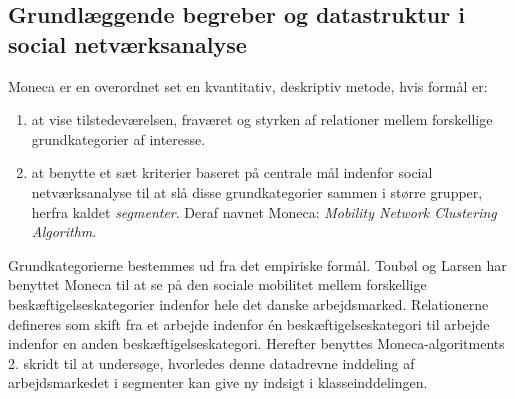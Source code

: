 

\subsection{Grundlæggende begreber og datastruktur i social netværksanalyse}

Moneca er en overordnet set en kvantitativ, deskriptiv metode, hvis formål er: 
%
\begin{enumerate} \label{monecaformaal}
  \item at vise tilstedeværelsen, fraværet og styrken af relationer mellem forskellige grundkategorier af interesse.
  \item at benytte et sæt kriterier baseret på centrale mål indenfor social netværksanalyse til at slå disse grundkategorier sammen i større grupper, herfra kaldet \emph{segmenter}. Deraf navnet Moneca: \emph{Mobility Network Clustering Algorithm}.
\end{enumerate}
%
Grundkategorierne bestemmes ud fra det empiriske formål. Toubøl og Larsen har benyttet Moneca til at se på den sociale mobilitet mellem forskellige beskæftigelseskategorier indenfor hele det danske arbejdsmarked. Relationerne defineres som skift fra et arbejde indenfor én beskæftigelseskategori til arbejde indenfor en anden beskæftigelseskategori. Herefter benyttes Moneca-algoritments 2. skridt til at undersøge, hvorledes denne datadrevne inddeling af arbejdsmarkedet i segmenter kan give ny indsigt i klasseinddelingen. 


